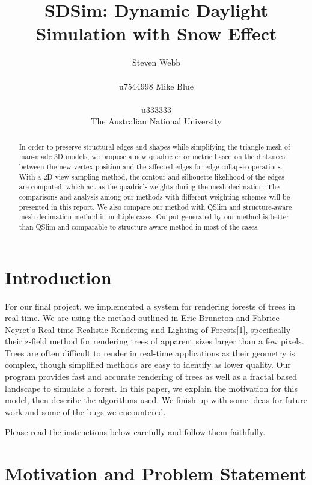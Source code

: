 \documentclass{article}
\title{SDSim: Dynamic Daylight Simulation with Snow Effect}
\author{%
  Steven Webb\\\\
  u7544998 
   \And
  Mike Blue\\\\
  u333333\\
  \AND  The Australian National University 
}
\begin{document}
\maketitle


\begin{abstract}
  In order to preserve structural edges and shapes while simplifying the triangle mesh of man-made 3D models, we propose a new quadric error metric based on the distances between the new vertex position and the affected edges for edge collapse operations. With a 2D view sampling method, the contour and silhouette likelihood of the edges are computed, which act as the quadric’s weights during the mesh decimation. The comparisons and analysis among our methods with different weighting schemes will be presented in this report. We also compare our method with QSlim  and structure-aware mesh decimation method in multiple cases. Output generated by our method is better than QSlim and comparable to structure-aware method in most of the cases. 
\end{abstract}


\section{Introduction}

For our final project, we implemented a system for rendering forests of trees in real time. We are using the method outlined in Eric Bruneton and Fabrice Neyret’s Real-time Realistic Rendering and Lighting of Forests[1], specifically their z-field method for rendering trees of apparent sizes larger than a few pixels. Trees are often difficult to render in real-time applications as their geometry is complex, though simplified methods are easy to identify as lower quality. Our program provides fast and accurate rendering of trees as well as a fractal based landscape to simulate a forest. In this paper, we explain the motivation for this model, then describe the algorithms used. We finish up with some ideas for future work and some of the bugs we encountered.

Please read the instructions below carefully and follow them faithfully. 


\section{Motivation and Problem Statement}
\end{document}

